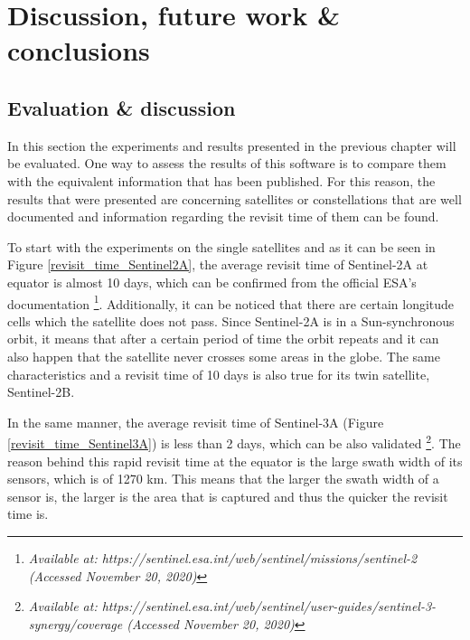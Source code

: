 \chapter{Discussion, future work \& conclusions}
\label{chap:5}

\bigskip
\section{Evaluation \& discussion}
\bigskip

In this section the experiments and results presented in the previous chapter will be evaluated. One way to assess the results of this software is to compare them with the equivalent information that has been published. For this reason, the results that were presented are concerning satellites or constellations that are well documented and information regarding the revisit time of them can be found.

To start with the experiments on the single satellites and as it can be seen in Figure \ref{revisit_time_Sentinel2A}, the average revisit time of Sentinel-2A at equator is almost 10 days, which can be confirmed from the official ESA's documentation \footnote{\label{Sentinel2_source}\textit{Available at: https://sentinel.esa.int/web/sentinel/missions/sentinel-2 (Accessed November 20, 2020)}}. Additionally, it can be noticed that there are certain longitude cells which the satellite does not pass. Since Sentinel-2A is in a Sun-synchronous orbit, it means that after a certain period of time the orbit repeats and it can also happen that the satellite never crosses some areas in the globe. The same characteristics and a revisit time of 10 days is also true for its twin satellite, Sentinel-2B.

\bigskip
In the same manner, the average revisit time of Sentinel-3A (Figure \ref{revisit_time_Sentinel3A}) is less than 2 days, which can be also validated \footnote{\label{Sentinel3A_source}\textit{Available at: https://sentinel.esa.int/web/sentinel/user-guides/sentinel-3-synergy/coverage (Accessed November 20, 2020)}}. The reason behind this rapid revisit time at the equator is the large swath width of its sensors, which is of 1270 km. This means that the larger the swath width of a sensor is, the larger is the area that is captured and thus the quicker the revisit time is.

